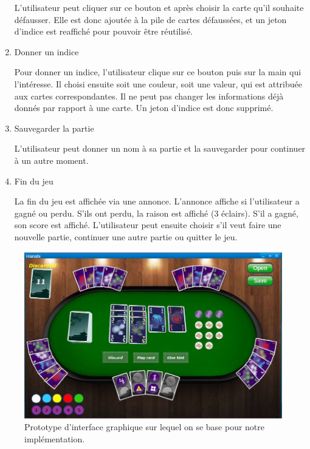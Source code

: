 \documentclass[11pt, letterpaper]{article}
\begin{document}
\begin{enumerate}
 L'utilisateur peut cliquer sur ce bouton et après choisir la carte qu'il souhaite défausser. Elle est donc ajoutée à la pile de cartes défaussées, et un jeton d'indice est reaffiché pour pouvoir être réutilisé.\\

\item  {Donner un indice}

 Pour donner un indice, l'utilisateur clique sur ce bouton puis sur la main qui l'intéresse. Il choisi ensuite soit une couleur, soit une valeur, qui est attribuée aux cartes correspondantes. Il ne peut pas changer les informations déjà donnés par rapport à une carte. Un jeton d'indice est donc supprimé.\\

\item  {Sauvegarder la partie}

 L'utilisateur peut donner un nom à sa partie et la sauvegarder pour continuer à un autre moment.\\

\item  {Fin du jeu}

 La fin du jeu est affichée via une annonce. L'annonce affiche si l'utilisateur a gagné ou perdu. S'ils ont perdu, la raison est affiché (3 éclairs). S'il a gagné, son score est affiché. L'utilisateur peut ensuite choisir s'il veut faire une nouvelle partie, continuer une autre partie ou quitter le jeu.\\

\end{enumerate}


\begin{figure}[h]
\centering
\includegraphics[scale = 0.4]{ihm.jpg}
\caption{Prototype d'interface graphique sur lequel on se base pour notre implémentation.}
\end{figure}
\end{document}
